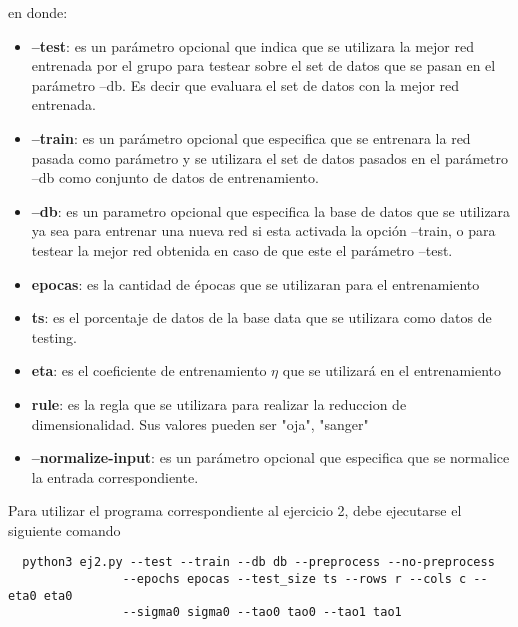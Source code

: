 en donde:
\begin{itemize}
  \item \textbf{--test}: es un parámetro opcional que indica que se utilizara la mejor red entrenada por el grupo para testear sobre el set de datos que se pasan en el parámetro
  --db. Es decir que evaluara el set de datos con la mejor red entrenada.
  \item \textbf{--train}: es un parámetro opcional que especifica que se entrenara la red pasada como parámetro y se utilizara el set de datos pasados en el parámetro --db
  como conjunto de datos de entrenamiento.
  \item \textbf{--db}: es un parametro opcional que especifica la base de datos que se utilizara ya sea para entrenar una nueva red si esta activada la opción --train, o
  para testear la mejor red obtenida en caso de que este el parámetro --test.
  \item \textbf{epocas}: es la cantidad de épocas que se utilizaran para el entrenamiento
  \item \textbf{ts}: es el porcentaje de datos de la base data que se utilizara como datos de testing.
  \item \textbf{eta}: es el coeficiente de entrenamiento $\eta$ que se utilizará en el entrenamiento
  \item \textbf{rule}: es la regla que se utilizara para realizar la reduccion de dimensionalidad. Sus valores pueden ser {"oja", "sanger"}
  \item \textbf{--normalize-input}: es un parámetro opcional que especifica que se normalice la entrada correspondiente.
\end{itemize}

Para utilizar el programa correspondiente al ejercicio 2, debe ejecutarse el siguiente comando
\begin{verbatim}
  python3 ej2.py --test --train --db db --preprocess --no-preprocess
                --epochs epocas --test_size ts --rows r --cols c --eta0 eta0
                --sigma0 sigma0 --tao0 tao0 --tao1 tao1
\end{verbatim}

